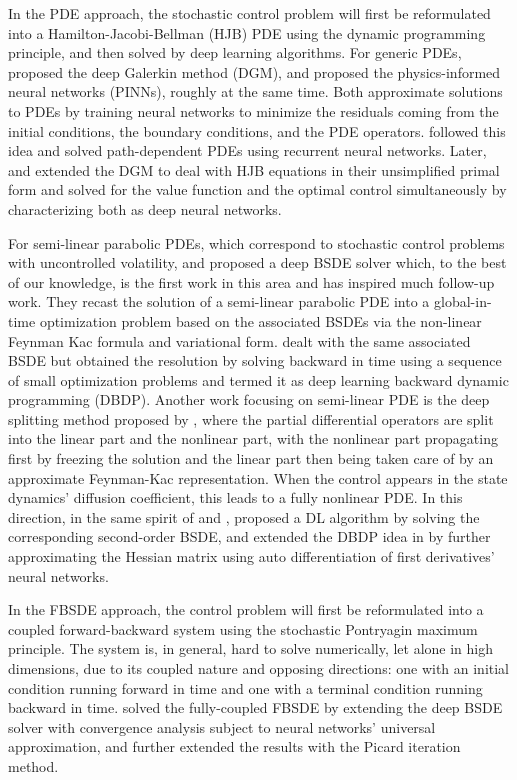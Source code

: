 \documentclass[12pt]{article}
\begin{document}
In the PDE approach, the stochastic control problem will first be reformulated into a Hamilton-Jacobi-Bellman (HJB) PDE using the dynamic programming principle, and then solved by deep learning algorithms. For generic PDEs, \cite{SiSp:18} proposed the deep Galerkin method (DGM), and \cite{raissi2019physics} proposed the physics-informed neural networks (PINNs), roughly at the same time. Both approximate solutions to PDEs by training neural networks to minimize the residuals coming from the initial conditions, the boundary conditions, and the PDE operators. \cite{saporito2021path} followed this idea and solved path-dependent PDEs using recurrent neural networks. Later, \cite{al2022extensions} and \cite{duarte2018machine} extended the DGM to deal with HJB equations in their unsimplified primal form and solved for the value function and the optimal control simultaneously by characterizing both as deep neural networks. 


For semi-linear parabolic PDEs, which correspond to stochastic control problems with uncontrolled volatility, \cite{MR3736669} and \cite{HaJeE:18} proposed a deep BSDE solver which, to the best of our knowledge, is the first work in this area and has inspired much follow-up work. They recast the solution of a semi-linear parabolic PDE into a global-in-time optimization problem based on the associated BSDEs via the non-linear Feynman Kac formula and variational form. \cite{hurephamwarin2020deep} dealt with the same associated BSDE but obtained the resolution by solving backward in time using a sequence of small optimization problems and termed it as deep learning backward dynamic programming (DBDP). Another work focusing on semi-linear PDE is the deep splitting method proposed by \cite{beck2021deep}, where the partial differential operators are split into the linear part and the nonlinear part, with the nonlinear part propagating first by freezing the solution and the linear part then being taken care of by an approximate Feynman-Kac representation. When the control appears in the state dynamics' diffusion coefficient, this leads to a fully nonlinear PDE. In this direction, in the same spirit of \cite{MR3736669} and \cite{HaJeE:18}, \cite{BeEJe:19} proposed a DL algorithm by solving the corresponding second-order BSDE, and \cite{pham2021neural} extended the DBDP idea in \cite{hurephamwarin2020deep} by further approximating the Hessian matrix using auto differentiation of first derivatives' neural networks.

In the FBSDE approach, the control problem will first be reformulated into a coupled forward-backward system using the stochastic Pontryagin maximum principle. The system is, in general, hard to solve numerically, let alone in high dimensions, due to its coupled nature and opposing directions: one with an initial condition running forward in time and one with a terminal condition running backward in time. \cite{han2020convergence} solved the fully-coupled FBSDE by extending the deep BSDE solver with convergence analysis subject to neural networks' universal approximation, and \cite{ji2020three} further extended the results with the Picard iteration method. 
\end{document}
